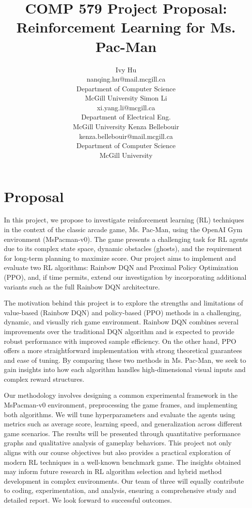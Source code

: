 \documentclass{article}
\title{COMP 579 Project Proposal: Reinforcement Learning for Ms. Pac-Man}
\author{
  Ivy Hu \\
  nanqing.hu@mail.mcgill.ca \\
  Department of Computer Science\\
  McGill University
  \And
  Simon Li \\
  xi.yang.li@mcgill.ca\\
  Department of Electrical Eng.\\
  McGill University
  \And
  Kenza Bellebouir\\
  kenza.bellebouir@mail.mcgill.ca\\
  Department of Computer Science\\
  McGill University
}
\begin{document}
\maketitle

\section{Proposal}
In this project, we propose to investigate reinforcement learning (RL) techniques in the context of the classic arcade game, Ms. Pac-Man, using the OpenAI Gym environment (MsPacman-v0). The game presents a challenging task for RL agents due to its complex state space, dynamic obstacles (ghosts), and the requirement for long-term planning to maximize score. Our project aims to implement and evaluate two RL algorithms: Rainbow DQN and Proximal Policy Optimization (PPO), and, if time permits, extend our investigation by incorporating additional variants such as the full Rainbow DQN architecture.

The motivation behind this project is to explore the strengths and limitations of value-based (Rainbow DQN) and policy-based (PPO) methods in a challenging, dynamic, and visually rich game environment. Rainbow DQN combines several improvements over the traditional DQN algorithm and is expected to provide robust performance with improved sample efficiency. On the other hand, PPO offers a more straightforward implementation with strong theoretical guarantees and ease of tuning. By comparing these two methods in Ms. Pac-Man, we seek to gain insights into how each algorithm handles high-dimensional visual inputs and complex reward structures.

Our methodology involves designing a common experimental framework in the MsPacman-v0 environment, preprocessing the game frames, and implementing both algorithms. We will tune hyperparameters and evaluate the agents using metrics such as average score, learning speed, and generalization across different game scenarios. The results will be presented through quantitative performance graphs and qualitative analysis of gameplay behaviors. This project not only aligns with our course objectives but also provides a practical exploration of modern RL techniques in a well-known benchmark game. The insights obtained may inform future research in RL algorithm selection and hybrid method development in complex environments. Our team of three will equally contribute to coding, experimentation, and analysis, ensuring a comprehensive study and detailed report. We look forward to successful outcomes.
\end{document}
